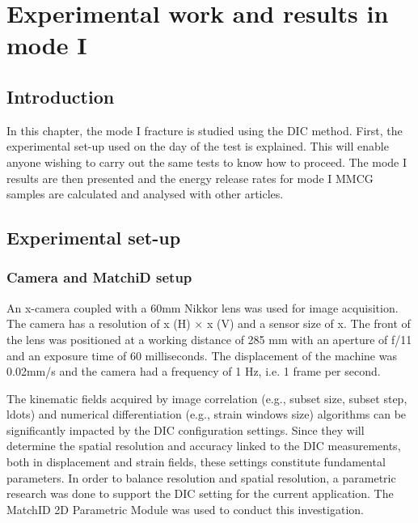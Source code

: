 \chapter{Experimental work and results in mode I}
\label{Chapter3}

\section{Introduction}

In this chapter, the mode I fracture is studied using the DIC method. First, the experimental set-up used on the day of the test is explained. This will enable anyone wishing to carry out the same tests to know how to proceed. The mode I results are then presented and the energy release rates for mode I MMCG samples are calculated and analysed with other articles.

\section{Experimental set-up}

\subsection{Camera and MatchiD setup}
An x-camera coupled with a 60mm Nikkor lens was used for image acquisition. The camera has a resolution of x (H) × x (V) and a sensor size of x. The front of the lens was positioned at a working distance of 285 mm with an aperture of f/11 and an exposure time of 60 milliseconds. The displacement of the machine was 0.02mm/s and the camera had a frequency of 1 Hz, i.e. 1 frame per second.

The kinematic fields acquired by image correlation (e.g., subset size, subset step, ldots) and numerical differentiation (e.g., strain windows size) algorithms can be significantly impacted by the DIC configuration settings. Since they will determine the spatial resolution and accuracy linked to the DIC measurements, both in displacement and strain fields, these settings constitute fundamental parameters.  In order to balance resolution and spatial resolution, a parametric research was done to support the DIC setting for the current application. The MatchID 2D Parametric Module was used to conduct this investigation.

